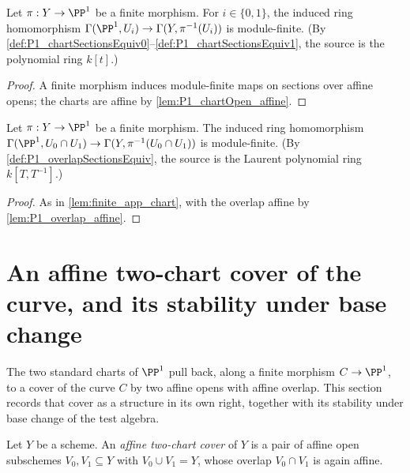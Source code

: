 \begin{lemma}
  \label{lem:finite_app_chart}
  \leanok
  Let \(\pi : Y \to \PP^1\) be a finite morphism. For \(i \in \{0,1\}\), the induced ring
  homomorphism \(\Gamma(\PP^1, U_i) \to \Gamma(Y, \pi^{-1}(U_i))\) is module-finite. (By
  \ref{def:P1_chartSectionsEquiv0}--\ref{def:P1_chartSectionsEquiv1}, the source is the
  polynomial ring \(k[t]\).)
\end{lemma}
\begin{proof}
  \leanok
  A finite morphism induces module-finite maps on sections over affine opens; the charts are
  affine by \ref{lem:P1_chartOpen_affine}.
\end{proof}

\begin{lemma}
  \label{lem:finite_app_overlap}
  \leanok
  Let \(\pi : Y \to \PP^1\) be a finite morphism. The induced ring homomorphism
  \(\Gamma(\PP^1, U_0 \cap U_1) \to \Gamma(Y, \pi^{-1}(U_0 \cap U_1))\) is module-finite.
  (By \ref{def:P1_overlapSectionsEquiv}, the source is the Laurent polynomial ring
  \(k[T,T^{-1}]\).)
\end{lemma}
\begin{proof}
  \leanok
  As in \ref{lem:finite_app_chart}, with the overlap affine by \ref{lem:P1_overlap_affine}.
\end{proof}

\section{An affine two-chart cover of the curve, and its stability under base change}

The two standard charts of \(\PP^1\) pull back, along a finite morphism \(C \to \PP^1\), to a
cover of the curve \(C\) by two affine opens with affine overlap. This section records that
cover as a structure in its own right, together with its stability under base change of the
test algebra.

\begin{definition}
  \label{def:AffineTwoCover}
  \leanok
  Let \(Y\) be a scheme. An \emph{affine two-chart cover} of \(Y\) is a pair of affine open
  subschemes \(V_0, V_1 \subseteq Y\) with \(V_0 \cup V_1 = Y\), whose overlap \(V_0 \cap V_1\)
  is again affine.
\end{definition}


